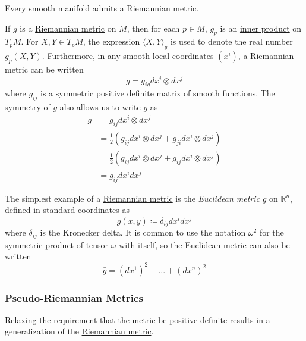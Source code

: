 \documentclass{article}
\newcounter{theorem}[section]
\newcounter{example}[section]
\begin{document}
    \begin{theorem}
      \label{thm:existence-of-riemannian-metrics}
    Every smooth manifold admits a \hyperref[def:riemannian-metric]{Riemannian metric}. 
    \end{theorem}

    If $g$ is a \hyperref[def:riemannian-metric]{Riemannian metric} on $M$, then for each $p \in M$, $g_p$ is an \hyperref[lin-def:inner-product]{inner product} on $T_p M$. For $X, Y \in T_p M$, the expression $\langle X, Y \rangle_g$ is used to denote the real number $g_p (X, Y)$. Furthermore, in any smooth local coordinates $(x^i)$, a Riemannian metric can be written 
    \begin{equation}
      g = g_{i g} dx^i \otimes dx^j
    \end{equation}
    where $g_{ij}$ is a symmetric positive definite matrix of smooth functions. The symmetry of $g$ also allows us to write $g$ as 
    \begin{align*}
        g & = g_{ij} dx^i \otimes dx^j \\
        & = \frac{1}{2} (g_{ij} dx^i \otimes dx^j + g_{ji} dx^i \otimes dx^j) \\
        & = \frac{1}{2} (g_{ij} dx^i \otimes dx^j + g_{ij} dx^i \otimes dx^j) \\
        & = g_{ij} dx^i dx^j 
    \end{align*}

    \begin{example}
      \label{ex:euclidean-metric}
    The simplest example of a \hyperref[def:riemannian-metric]{Riemannian metric} is the \textit{Euclidean metric} $\bar{g}$ on $\mathbb{R}^n$, defined in standard coordinates as 
    \begin{equation}
      \bar{g}(x, y) \coloneqq \delta_{ij} dx^i dx^j
    \end{equation}
    where $\delta_{ij}$ is the Kronecker delta. It is common to use the notation $\omega^2$ for the \hyperref[def:symmetric-product]{symmetric product} of tensor $\omega$ with itself, so the Euclidean metric can also be written 
    \begin{equation}
      \bar{g} = (dx^1)^2 + ... + (dx^n)^2
    \end{equation}
    \end{example}

    \subsubsection{Pseudo-Riemannian Metrics}
      Relaxing the requirement that the metric be positive definite results in a generalization of the \hyperref[def:riemannian-metric]{Riemannian  metric}. 
\end{document}
